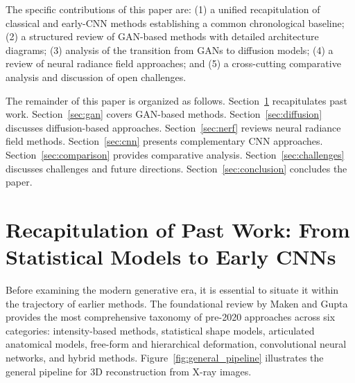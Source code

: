 \documentclass[10pt,twocolumn,a4paper]{article}
\begin{document}
The specific contributions of this paper are: (1) a unified recapitulation of
classical and early-CNN methods establishing a common chronological baseline;
(2) a structured review of GAN-based methods with detailed architecture
diagrams; (3) analysis of the transition from GANs to diffusion models;
(4) a review of neural radiance field approaches; and (5) a cross-cutting
comparative analysis and discussion of open challenges.

The remainder of this paper is organized as follows. Section~\ref{sec:past}
recapitulates past work. Section~\ref{sec:gan} covers GAN-based methods.
Section~\ref{sec:diffusion} discusses diffusion-based approaches.
Section~\ref{sec:nerf} reviews neural radiance field methods.
Section~\ref{sec:cnn} presents complementary CNN approaches.
Section~\ref{sec:comparison} provides comparative analysis.
Section~\ref{sec:challenges} discusses challenges and future directions.
Section~\ref{sec:conclusion} concludes the paper.

\section{Recapitulation of Past Work: From Statistical Models to Early CNNs}
\label{sec:past}

Before examining the modern generative era, it is essential to situate it
within the trajectory of earlier methods. The foundational review by Maken and
Gupta~\cite{maken2023} provides the most comprehensive taxonomy of pre-2020
approaches across six categories: intensity-based methods, statistical shape
models, articulated anatomical models, free-form and hierarchical deformation,
convolutional neural networks, and hybrid methods. Figure~\ref{fig:general_pipeline}
illustrates the general pipeline for 3D reconstruction from X-ray images.
\end{document}
